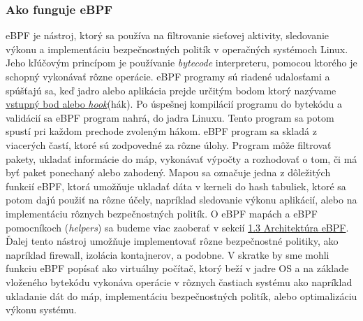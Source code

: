 \subsubsection{Ako funguje eBPF} 
eBPF je nástroj, ktorý sa používa na filtrovanie sieťovej aktivity, sledovanie výkonu a implementáciu bezpečnostných politík v operačných systémoch Linux. 
Jeho kľúčovým princípom je používanie \emph{bytecode} interpreteru, pomocou ktorého je schopný vykonávať rôzne operácie. eBPF programy sú riadené udalosťami a 
spúšťajú sa, keď jadro alebo aplikácia prejde určitým bodom ktorý nazývame \hyperref[sec:hooks]{ vstupný bod alebo \emph{hook}}(hák).  Po úspešnej kompilácií 
programu do bytekódu a validácií sa eBPF program nahrá, do jadra Linuxu. Tento program sa potom spustí pri každom prechode zvoleným hákom. 
eBPF program sa skladá z viacerých častí, ktoré sú zodpovedné za rôzne úlohy. Program môže filtrovať pakety, ukladať informácie do máp, vykonávať výpočty 
a rozhodovať o tom, či má byť paket ponechaný alebo zahodený. Mapou sa označuje jedna z dôležitých funkcií eBPF, ktorá umožňuje ukladať dáta v kerneli 
do hash tabuliek, ktoré sa potom dajú použiť na rôzne účely, napríklad sledovanie výkonu aplikácií, alebo na implementáciu rôznych bezpečnostných politík. 
O eBPF mapách a eBPF pomocníkoch (\emph{helpers}) sa budeme viac zaoberať v sekcií \hyperref[sec:architecture]{1.3 Architektúra eBPF}. 
Ďalej tento nástroj umožňuje implementovať rôzne bezpečnostné politiky, ako napríklad firewall, izolácia kontajnerov, a podobne. V skratke by sme mohli 
funkciu eBPF popísať ako virtuálny počítač, ktorý beží v jadre OS a na základe vloženého bytekódu vykonáva operácie v rôznych častiach systému ako 
napríklad ukladanie dát do máp, implementáciu bezpečnostných politík, alebo optimalizáciu výkonu systému.~\cite{eBPF}

